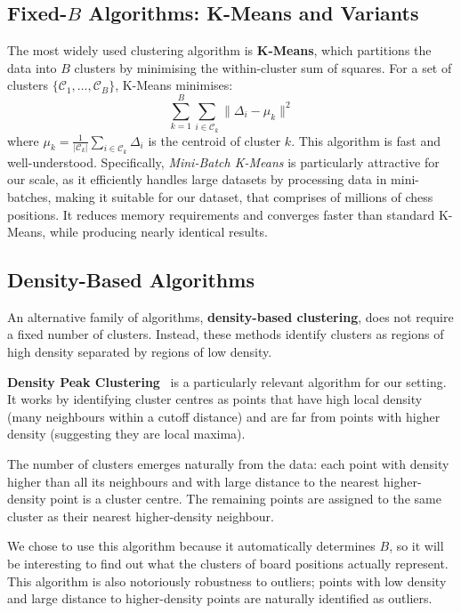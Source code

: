 \subsection{Fixed-\texorpdfstring{\(B\)}{B} Algorithms: K-Means and Variants}\label{sec:kmeans}

The most widely used clustering algorithm is \textbf{K-Means}, which partitions the data into \(B\) clusters by minimising the within-cluster sum of squares. For a set of clusters \(\{\mathcal{C}_1, \dots, \mathcal{C}_B\}\), K-Means minimises:
\[
\sum_{k=1}^B \sum_{i \in \mathcal{C}_k} \lVert\Delta_i - \mu_k\rVert^2
\]
where \(\mu_k = \frac{1}{|\mathcal{C}_k|} \sum_{i \in \mathcal{C}_k} \Delta_i\) is the centroid of cluster \(k\). This algorithm is fast and well-understood. Specifically, \emph{Mini-Batch K-Means} is particularly attractive for our scale, as it efficiently handles large datasets by processing data in mini-batches, making it suitable for our dataset, that comprises of millions of chess positions. It reduces memory requirements and converges faster than standard K-Means, while producing nearly identical results.

\subsection{Density-Based Algorithms}\label{sec:density-cluster}

An alternative family of algorithms, \textbf{density-based clustering}, does not require a fixed number of clusters. Instead, these methods identify clusters as regions of high density separated by regions of low density.

\textbf{Density Peak Clustering}~\cite{rodriguez2014density} is a particularly relevant algorithm for our setting. It works by identifying cluster centres as points that have high local density (many neighbours within a cutoff distance) and are far from points with higher density (suggesting they are local maxima).

The number of clusters emerges naturally from the data: each point with density higher than all its neighbours and with large distance to the nearest higher-density point is a cluster centre. The remaining points are assigned to the same cluster as their nearest higher-density neighbour.

We chose to use this algorithm because it automatically determines \(B\), so it will be interesting to find out what the clusters of board positions actually represent. This algorithm is also notoriously robustness to outliers; points with low density and large distance to higher-density points are naturally identified as outliers.

